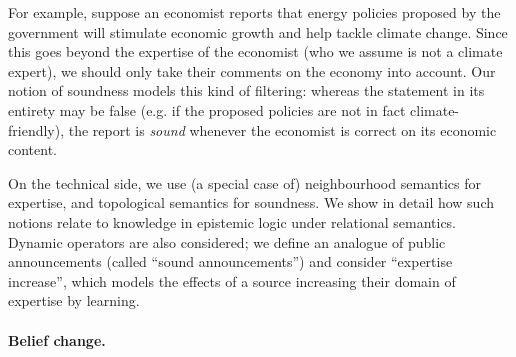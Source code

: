 {For example, suppose an economist reports that energy policies proposed by the
government will stimulate economic growth and help tackle climate change. Since
this goes beyond the expertise of the economist (who we assume is not a climate
expert), we should only take their comments on the economy into account. Our
notion of soundness models this kind of filtering: whereas the statement in its
entirety may be false (e.g. if the proposed policies are not in fact
climate-friendly), the report is \emph{sound} whenever the economist is correct
on its economic content.

On the technical side, we use (a special case of) neighbourhood semantics for
expertise, and topological semantics for soundness. We show in detail how such
notions relate to knowledge in epistemic logic under relational semantics.
Dynamic operators are also considered; we define an analogue of public
announcements (called ``sound announcements'') and consider ``expertise
increase'', which models the effects of a source increasing their domain of
expertise by learning.


}

\paragraph{Belief change.}

